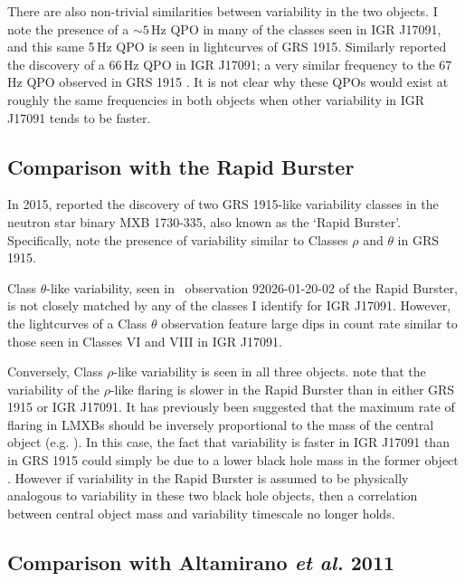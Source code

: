 \par There are also non-trivial similarities between variability in the two objects.  I note the presence of a $\sim5$\,Hz QPO in many of the classes seen in IGR J17091, and this same 5\,Hz QPO is seen in lightcurves of GRS 1915.  Similarly \citet{Altamirano_HFQPO} reported the discovery of a 66\,Hz QPO in IGR J17091; a very similar frequency to the 67\,Hz QPO observed in GRS 1915 \citep{Morgan_QPO}.  It is not clear why these QPOs would exist at roughly the same frequencies in both objects when other variability in IGR J17091 tends to be faster.

\subsection{Comparison with the Rapid Burster}

\par In 2015, \citet{Bagnoli_RB} reported the discovery of two GRS 1915-like variability classes in the neutron star binary MXB 1730-335, also known as the `Rapid Burster'.  Specifically, \citet{Bagnoli_RB} note the presence of variability similar to Classes $\rho$ and $\theta$ in GRS 1915.
\par Class $\theta$-like variability, seen in \rxte\ observation 92026-01-20-02 of the Rapid Burster, is not closely matched by any of the classes I identify for IGR J17091.  However, the lightcurves of a Class $\theta$ observation feature large dips in count rate similar to those seen in Classes VI and VIII in IGR J17091.
\par Conversely, Class $\rho$-like variability is seen in all three objects.  \citet{Bagnoli_RB} note that the variability of the $\rho$-like flaring is slower in the Rapid Burster than in either GRS 1915 or IGR J17091. It has previously been suggested that the maximum rate of flaring in LMXBs should be inversely proportional to the mass of the central object (e.g. \citealp{Belloni_Timescales,Frank_Timescales}).  In this case, the fact that variability is faster in IGR J17091 than in GRS 1915 could simply be due to a lower black hole mass in the former object \citep{Altamirano_IGR_FH}.  However if variability in the Rapid Burster is assumed to be physically analogous to variability in these two black hole objects, then a correlation between central object mass and variability timescale no longer holds.

\subsection{Comparison with Altamirano \textit{et al.} 2011}

